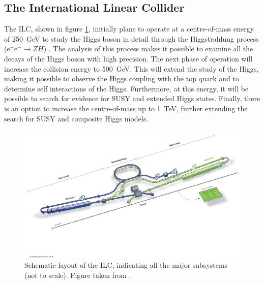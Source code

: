 
\subsection{The International Linear Collider}
The ILC, shown in figure \ref{fig:ilc}, initially plans to operate at a centre-of-mass energy of 250~GeV to study the Higgs boson in detail through the Higgstrahlung process ($\text{e}^{+}\text{e}^{-} \rightarrow ZH$) \cite{Behnke:2013xla}.  The analysis of this process makes it possible to examine all the decays of the Higgs boson with high precision.  The next phase of operation will increase the collision energy to 500~GeV.  This will extend the study of the Higgs, making it possible to observe the Higgs coupling with the top quark and to determine self interactions of the Higgs.  Furthermore, at this energy, it will be possible to search for evidence for SUSY and extended Higgs states.  Finally, there is an option to increase the centre-of-mass up to 1~TeV, further extending the search for SUSY and composite Higgs models.

\begin{figure}[h!]
\includegraphics[width=1.0\textwidth]{Introduction/Plots/ILC.jpg}
\caption[Schematic layout of the ILC, indicating all the major subsystems (not to scale).  Figure taken from \cite{Behnke:2013xla}.]{Schematic layout of the ILC, indicating all the major subsystems (not to scale).  Figure taken from \cite{Behnke:2013xla}.}
\label{fig:ilc}
\end{figure}



